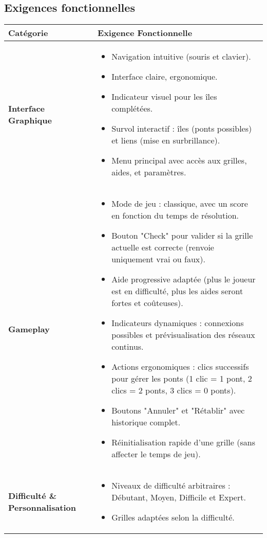 \subsection{Exigences fonctionnelles}

\begin{longtable}{|p{3.5cm}|p{12cm}|}
\hline
\textbf{Catégorie} & \textbf{Exigence Fonctionnelle} \\
\hline
\textbf{Interface \newline Graphique} & 
\begin{itemize}
    \item Navigation intuitive (souris et clavier).
    \item Interface claire, ergonomique.
    \item Indicateur visuel pour les îles complétées.
    \item Survol interactif : îles (ponts possibles) et liens (mise en surbrillance).
    \item Menu principal avec accès aux grilles, aides, et paramètres.
\end{itemize} \\
\hline
\textbf{Gameplay} & 
\begin{itemize}
    \item Mode de jeu : classique, avec un score en fonction du temps de résolution.
    \item Bouton "Check" pour valider si la grille actuelle est correcte (renvoie uniquement vrai ou faux).
    \item Aide progressive adaptée (plus le joueur est en difficulté, plus les aides seront fortes et coûteuses).
    \item Indicateurs dynamiques : connexions possibles et prévisualisation des réseaux continus.
    \item Actions ergonomiques : clics successifs pour gérer les ponts (1 clic = 1 pont, 2 clics = 2 ponts, 3 clics = 0 ponts).
    \item Boutons "Annuler" et "Rétablir" avec historique complet.
    \item Réinitialisation rapide d’une grille (sans affecter le temps de jeu).
\end{itemize} \\
\hline
\textbf{Difficulté \&  \newline Personnalisation} & 
\begin{itemize}
    \item Niveaux de difficulté arbitraires : Débutant, Moyen, Difficile et Expert.
    \item Grilles adaptées selon la difficulté.

\end{itemize}
\end{longtable}
